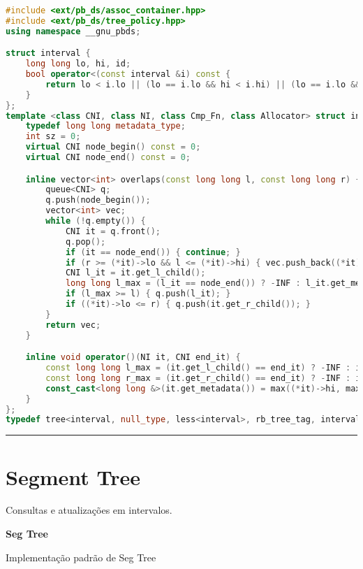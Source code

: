 \documentclass[11pt, a4paper, twoside]{book}
\begin{document}
\begin{lstlisting}[language=C++]
#include <ext/pb_ds/assoc_container.hpp>
#include <ext/pb_ds/tree_policy.hpp>
using namespace __gnu_pbds;

struct interval {
    long long lo, hi, id;
    bool operator<(const interval &i) const {
        return lo < i.lo || (lo == i.lo && hi < i.hi) || (lo == i.lo && hi == i.hi && id < i.id);
    }
};
template <class CNI, class NI, class Cmp_Fn, class Allocator> struct intervals_node_update {
    typedef long long metadata_type;
    int sz = 0;
    virtual CNI node_begin() const = 0;
    virtual CNI node_end() const = 0;

    inline vector<int> overlaps(const long long l, const long long r) {
        queue<CNI> q;
        q.push(node_begin());
        vector<int> vec;
        while (!q.empty()) {
            CNI it = q.front();
            q.pop();
            if (it == node_end()) { continue; }
            if (r >= (*it)->lo && l <= (*it)->hi) { vec.push_back((*it)->id); }
            CNI l_it = it.get_l_child();
            long long l_max = (l_it == node_end()) ? -INF : l_it.get_metadata();
            if (l_max >= l) { q.push(l_it); }
            if ((*it)->lo <= r) { q.push(it.get_r_child()); }
        }
        return vec;
    }

    inline void operator()(NI it, CNI end_it) {
        const long long l_max = (it.get_l_child() == end_it) ? -INF : it.get_l_child().get_metadata();
        const long long r_max = (it.get_r_child() == end_it) ? -INF : it.get_r_child().get_metadata();
        const_cast<long long &>(it.get_metadata()) = max((*it)->hi, max(l_max, r_max));
    }
};
typedef tree<interval, null_type, less<interval>, rb_tree_tag, intervals_node_update> interval_tree;
\end{lstlisting}

\hfill

\rule{\textwidth}{0.4pt}

\section{Segment Tree}



Consultas e atualizações em intervalos.



\textbf{Seg Tree} 

Implementação padrão de Seg Tree
\end{document}
